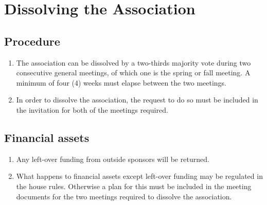 \section*{Dissolving the Association}
\subsection{Procedure}
\begin{enumerate}
  \item The association can be dissolved by a two-thirds majority vote during two consecutive general meetings, of which one is the spring or fall meeting. A minimum of four (4) weeks must elapse between the two meetings.
  \item In order to dissolve the association, the request to do so must be included in the invitation for both of the meetings required.
\end{enumerate}

\subsection{Financial assets}
\begin{enumerate}
  \item Any left-over funding from outside sponsors will be returned.
  \item What happens to financial assets except left-over funding may be regulated in the house rules. Otherwise a plan for this must be included in the meeting documents for the two meetings required to dissolve the association.
\end{enumerate}